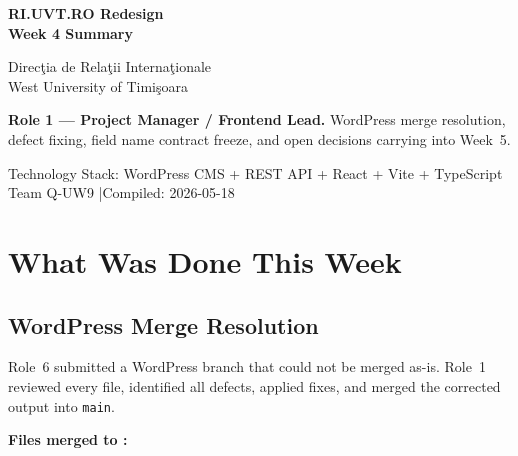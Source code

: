 \documentclass[12pt,a4paper]{article}
\begin{document}
\color{textGray}

\begin{titlepage}
\pagecolor{uvtDarkBlue}\color{white}
\vspace*{2cm}
{\Huge\bfseries RI.UVT.RO Redesign\\[0.35em]
Week 4 Summary\par}
\vspace{0.8cm}
{\Large Direc\c{t}ia de Rela\c{t}ii Interna\c{t}ionale\\
West University of Timi\c{s}oara\par}
\vspace{1.5cm}
\begin{yellowbox}
\color{textGray}
\textbf{Role 1 --- Project Manager / Frontend Lead.}
WordPress merge resolution, defect fixing, field name contract freeze,
and open decisions carrying into Week~5.
\end{yellowbox}
\vfill
{\large Technology Stack: WordPress CMS + REST API + React + Vite + TypeScript\\[4pt]
Team Q-UW9 \quad|\quad Compiled: 2026-05-18}
\vspace{1cm}
\end{titlepage}
\nopagecolor\color{textGray}

\section{What Was Done This Week}

\subsection{WordPress Merge Resolution}

Role~6 submitted a WordPress branch that could not be merged as-is.
Role~1 reviewed every file, identified all defects, applied fixes,
and merged the corrected output into \texttt{main}.

\vspace{0.6em}
\noindent\textbf{Files merged to :}
\vspace{0.4em}
\end{document}
